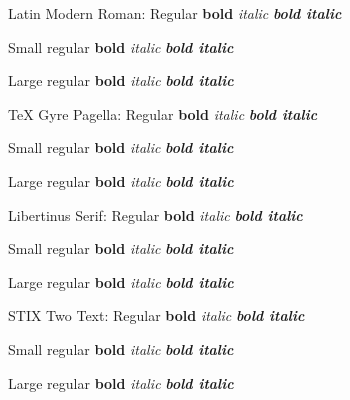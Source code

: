 \documentclass{article}
\newcommand\sample[1]{#1: Regular \textbf{bold} \textit{italic} \textbf{\textit{bold italic}}

{\footnotesize Small regular \textbf{bold} \textit{italic} \textbf{\textit{bold italic}}\par}

{\Large Large regular \textbf{bold} \textit{italic} \textbf{\textit{bold italic}}\par}\bigskip}
\begin{document}
\sample{Latin Modern Roman}
{\pagella\sample{TeX Gyre Pagella}}
{\libertinus\sample{Libertinus Serif}}
{\stix\sample{STIX Two Text}}
\end{document}
